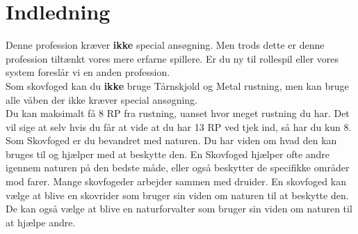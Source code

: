 \chapter{Indledning}

Denne profession kræver \textbf{ikke} special ansøgning. Men trods dette er denne profession tiltænkt vores mere erfarne spillere. Er du ny til rollespil eller vores system foreslår vi en anden profession.\\
Som skovfoged kan du \textbf{ikke} bruge Tårnskjold og Metal rustning, men kan bruge alle våben der ikke kræver special ansøgning.\\
Du kan maksimalt få 8 RP fra rustning, uanset hvor meget rustning du har. Det vil sige at selv hvis du får at vide at du har 13 RP ved tjek ind, så har du kun 8.\\

Som Skovfoged er du bevandret med naturen. Du har viden om hvad den kan bruges til og hjælper med at beskytte den. En Skovfoged hjælper ofte andre igennem naturen på den bedste måde, eller også beskytter de specifikke områder mod farer. Mange skovfogeder arbejder sammen med druider. En skovfoged kan vælge at blive en skovrider som bruger sin viden om naturen til at beskytte den. De kan også vælge at blive en naturforvalter som bruger sin viden om naturen til at hjælpe andre. 
